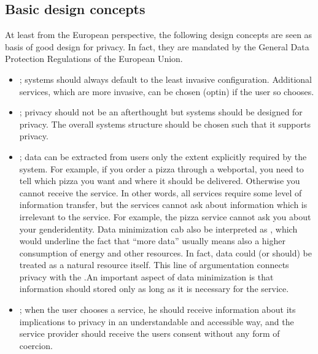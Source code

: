 \documentclass[letterpaper,10pt,english]{jupyterBook}
\begin{document}
\subsection{Basic design concepts}
\label{\detokenize{Security_and_privacy:basic-design-concepts}}
\sphinxAtStartPar
At least from the European perspective, the following design concepts
are seen as basis of good design for privacy. In fact, they are mandated
by the General Data Protection Regulations of the European Union.
\begin{itemize}
\item {} 
\sphinxAtStartPar
{}; systems should always default to the least
invasive configuration. Additional services, which are more
invasive, can be chosen (opt\sphinxhyphen{}in) if the user so chooses.

\item {} 
\sphinxAtStartPar
{}; privacy should not be an after\sphinxhyphen{}thought but
systems should be designed for privacy. The overall systems
structure should be chosen such that it supports privacy.

\item {} 
\sphinxAtStartPar
{}; data can be extracted from users only the
extent explicitly required by the system. For example, if you order
a pizza through a web\sphinxhyphen{}portal, you need to tell which pizza you want
and where it should be delivered. Otherwise you cannot receive the
service. In other words, all services require some level of
information transfer, but the services cannot ask about information
which is irrelevant to the service. For example, the pizza service
cannot ask you about your gender\sphinxhyphen{}identity. Data minimization cab
also be interpreted as , which would underline the
fact that “more data” usually means also a higher consumption of
energy and other resources. In fact, data could (or should) be
treated as a natural resource itself. This line of argumentation
connects privacy with the .An important aspect of data minimization is that information should
stored only as long as it is necessary for the service.

\item {} 
\sphinxAtStartPar
{}; when the user chooses a service,
he should receive information about its implications to privacy in
an understandable and accessible way, and the service provider
should receive the users consent without any form of coercion.

\end{itemize}
\end{document}
